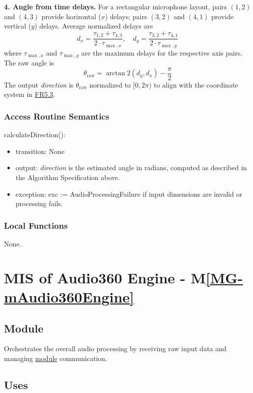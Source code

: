 \documentclass[12pt, titlepage]{article}
\newcommand{\mref}[1]{M\ref{#1}}
\begin{document}
\textbf{4. Angle from time delays.} For a rectangular microphone layout, pairs
$(1,2)$ and $(4,3)$ provide horizontal ($x$) delays; pairs $(3,2)$ and
$(4,1)$ provide vertical ($y$) delays. Average normalized delays are
\[
  d_x = \frac{\tau_{1,2} + \tau_{4,3}}{2 \cdot \tau_{\max,x}},\quad
  d_y = \frac{\tau_{3,2} + \tau_{4,1}}{2 \cdot \tau_{\max,y}}
\]
where $\tau_{\max,x}$ and $\tau_{\max,y}$ are the maximum delays for the
respective axis pairs. The raw angle is
\[
  \theta_{\text{raw}} = \arctan2(d_y, d_x) - \frac{\pi}{2}
\]
The output \textit{direction} is $\theta_{\text{raw}}$ normalized to
$[0, 2\pi)$ to align with the coordinate system in \hyperref[SRS-FR5_3]{FR5.3}.

\subsubsection{Access Routine Semantics}

\noindent calculateDirection():
\begin{itemize}
\item transition: None
\item output: \textit{direction} is the estimated angle in radians, computed as
  described in the Algorithm Specification above.
\item exception: exc := AudioProcessingFailure if input dimensions are invalid
  or processing fails.
\end{itemize}

\subsubsection{Local Functions}

None.

\newpage

\section{MIS of Audio360 Engine \label{mod:Audio360Engine} -
  \mref{MG-mAudio360Engine}}

\subsection{Module}

Orchestrates the overall audio processing by receiving raw input data and
managing \hyperref[mod:Audio360Engine_Uses]{module} communication.

\subsection{Uses}\label{mod:Audio360Engine_Uses}
\end{document}

